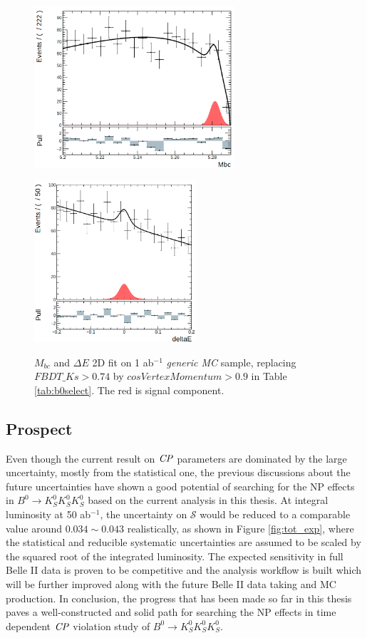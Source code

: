 \begin{figure}[htbp]
	\begin{minipage}[b]{0.5\linewidth}
		\centering 
		\includegraphics[height=6cm]{figures/mbcfit_noksdata.png}
		\label{}
	\end{minipage}
	\begin{minipage}[b]{0.5\linewidth}
		\centering 
		\includegraphics[height=6cm]{figures/dEfit_noksdata.png}
		\label{}
	\end{minipage}
	\caption{$M_{bc}$ and $\Delta E$ 2D fit on 1 ab$^{-1}$ \textit{generic MC} sample, replacing $FBDT\_Ks>0.74$ by ${cosVertexMomentum}>0.9$ in Table \ref{tab:b0select}. The red is signal component.}
	\label{fig:2Ddata_noks}
\end{figure}


\subsection{Prospect}
Even though the current result on $\it{CP}$ parameters are dominated by the large uncertainty, mostly from the statistical one, the previous discussions about the future uncertainties have shown a good potential of searching for the NP effects in $B^0 \to K_S^0  K_S^0  K_S^0$ based on the current analysis in this thesis. At integral luminosity at 50 ab$^{-1}$, the uncertainty on $\mathcal{S}$ would be reduced to a comparable value around $0.034\sim0.043$ realistically, as shown in Figure \ref{fig:tot_exp}, where the statistical and reducible systematic uncertainties are assumed to be scaled by the squared root of the integrated luminosity. The expected sensitivity in full Belle II data is proven to be competitive and the analysis workflow is built which will be further improved along with the future Belle II data taking and MC production. In conclusion, the progress that has been made so far in this thesis paves a well-constructed and solid path for searching the NP effects in time dependent $\it{CP}$ violation study of $B^0 \to K_S^0  K_S^0  K_S^0$. 
 
